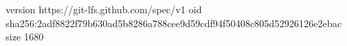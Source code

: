 version https://git-lfs.github.com/spec/v1
oid sha256:2adf8822f79b630ad5b8286a788cee9d59cdf94f50408c805d52926126e2ebac
size 1680
